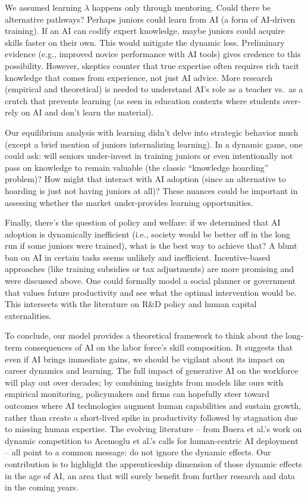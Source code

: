 \documentclass[12pt]{article}
\begin{document}
We assumed learning \(\lambda\) happens only through mentoring. Could
there be alternative pathways? Perhaps juniors could learn from AI (a
form of AI-driven training). If an AI can codify expert knowledge,
maybe juniors could acquire skills faster on their own. This would
mitigate the dynamic loss. Preliminary evidence (e.g., improved novice
performance with AI tools) gives credence to this possibility.
However, skeptics counter that true expertise often requires rich
tacit knowledge that comes from experience, not just AI advice. More
research (empirical and theoretical) is needed to understand AI's role
as a teacher vs.~as a crutch that {prevents} learning (as seen in
education contexts where students over-rely on AI and don't learn the
material).

Our equilibrium analysis with learning didn't delve into strategic
behavior much (except a brief mention of juniors internalizing
learning). In a dynamic game, one could ask: will seniors
{under-invest in training} juniors or even intentionally not pass
on knowledge to remain valuable (the classic ``knowledge hoarding''
problem)? How might that interact with AI adoption (since an
alternative to hoarding is just not having juniors at all)? These
nuances could be important in assessing whether the market
under-provides learning opportunities.

Finally, there's the question of {policy and welfare}: if we
determined that AI adoption is dynamically inefficient (i.e., society
would be better off in the long run if some juniors were trained),
what is the best way to achieve that? A blunt ban on AI in certain
tasks seems unlikely and inefficient. Incentive-based approaches (like
training subsidies or tax adjustments) are more promising and were
discussed above. One could formally model a social planner or
government that values future productivity and see what the optimal
intervention would be. This intersects with the literature on R\&D
policy and human capital externalities.

To conclude, our model provides a theoretical framework to think about
the {long-term consequences of AI on the labor force's skill
composition}. It suggests that even if AI brings immediate gains, we
should be vigilant about its impact on {career dynamics and
learning}. The full impact of generative AI on the workforce will play
out over decades; by combining insights from models like ours with
empirical monitoring, policymakers and firms can hopefully steer toward
outcomes where AI technologies {augment} human capabilities and
sustain growth, rather than create a short-lived spike in productivity
followed by stagnation due to missing human expertise. The evolving
literature -- from Buera et al.'s work on dynamic competition to
Acemoglu et al.'s calls for human-centric AI deployment -- all point to
a common message: {do not ignore the dynamic effects}. Our
contribution is to highlight the apprenticeship dimension of those
dynamic effects in the age of AI, an area that will surely benefit from
further research and data in the coming years.
\end{document}

